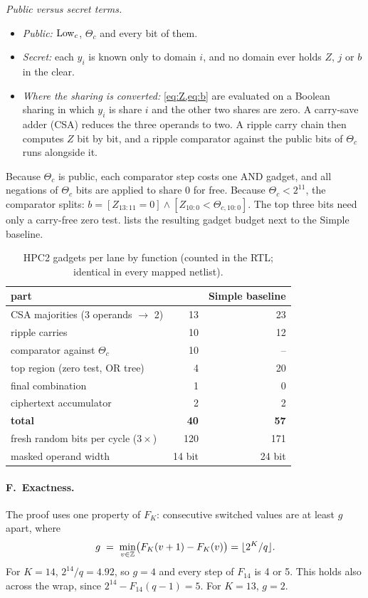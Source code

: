 \emph{Public versus secret terms.}
\begin{itemize}
  \item \emph{Public:} $\mathrm{Low}_c$, $\Theta_c$ and every bit of them.
  \item \emph{Secret:} each $y_i$ is known only to domain $i$, and no domain ever holds $Z$, $j$ or $b$ in the clear.
  \item \emph{Where the sharing is converted:} \cref{eq:Z,eq:b} are evaluated on a Boolean sharing in which $y_i$ is share $i$ and the other two shares are zero. A carry-save adder (CSA) reduces the three operands to two. A ripple carry chain then computes $Z$ bit by bit, and a ripple comparator against the public bits of $\Theta_c$ runs alongside it.
\end{itemize}
Because $\Theta_c$ is public, each comparator step costs one AND gadget, and all negations of $\Theta_c$ bits are applied to share 0 for free. Because $\Theta_c < 2^{11}$, the comparator splits: $b = [Z_{13:11} = 0] \wedge [Z_{10:0} < \Theta_{c,10:0}]$. The top three bits need only a carry-free zero test.  lists the resulting gadget budget next to the Simple baseline.

\begin{table}[t]\centering\small
\caption{HPC2 gadgets per lane by function (counted in the RTL; identical in every mapped netlist).}\label{tab:kernel}
\begin{tabular}{@{}lrr@{}}
\toprule
part & \PAMS{} & Simple baseline \\
\midrule
CSA majorities (3 operands $\to$ 2) & 13 & 23 \\
ripple carries & 10 & 12 \\
comparator against $\Theta_c$ & 10 & -- \\
top region (zero test, OR tree) & 4 & 20 \\
final combination & 1 & 0 \\
ciphertext accumulator & 2 & 2 \\
\midrule
\textbf{total} & \textbf{40} & \textbf{57} \\
fresh random bits per cycle ($3 \times$) & 120 & 171 \\
masked operand width & 14 bit & 24 bit \\
\bottomrule
\end{tabular}
\end{table}

\paragraph{F.~Exactness.}\label{sec:exact}
The proof uses one property of $F_K$: consecutive switched values are at least $g$ apart, where
\begin{equation}\label{eq:gap}
  g \;=\; \min_{v \in \mathbb{Z}}\bigl(F_K(v+1) - F_K(v)\bigr) = \lfloor 2^K/q \rfloor .
\end{equation}
For $K = 14$, $2^{14}/q = 4.92$, so $g = 4$ and every step of $F_{14}$ is 4 or 5. This holds also across the wrap, since $2^{14} - F_{14}(q-1) = 5$. For $K = 13$, $g = 2$.

